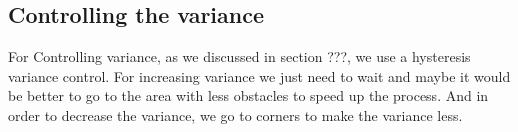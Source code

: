 

\subsection{Controlling the variance}


For Controlling variance, as we discussed in section ???, we use a hysteresis variance control. For increasing variance we just need to wait and maybe it would be better to go to the area with less obstacles to speed up the process. And in order to decrease the variance, we go to corners to make the variance less.



